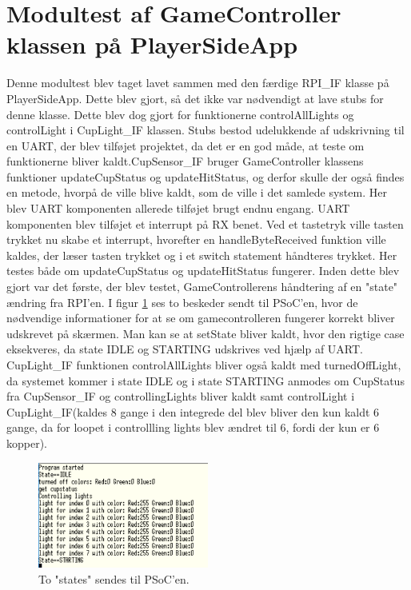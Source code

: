 \documentclass[Modultest/Modultest_main.tex]{subfiles}
\begin{document}
\section{Modultest af GameController klassen på PlayerSideApp}\label{sec:GameController_modultest_bilag}
Denne modultest blev taget lavet sammen med den færdige RPI\_IF klasse på PlayerSideApp. Dette blev gjort, så det ikke var nødvendigt at lave stubs for denne klasse. Dette blev dog gjort for funktionerne controlAllLights og controlLight i CupLight\_IF klassen. Stubs bestod udelukkende af udskrivning til en UART, der blev tilføjet projektet, da det er en god måde, at teste om funktionerne bliver kaldt.CupSensor\_IF bruger GameController klassens funktioner updateCupStatus og updateHitStatus, og derfor skulle der også findes en metode, hvorpå de ville blive kaldt, som de ville i det samlede system. Her blev UART komponenten allerede tilføjet brugt endnu engang. UART komponenten blev tilføjet et interrupt på RX benet. Ved et tastetryk ville tasten trykket nu skabe et interrupt, hvorefter en handleByteReceived funktion ville kaldes, der læser tasten trykket og i et switch statement håndteres trykket. Her testes både om updateCupStatus og updateHitStatus fungerer. Inden dette blev gjort var det første, der blev testet, GameControllerens håndtering af en "state" ændring fra RPI'en. I figur \ref{fig:IDLE_STARTING} ses to beskeder sendt til PSoC'en, hvor de nødvendige informationer for at se om gamecontrolleren fungerer korrekt bliver udskrevet på skærmen. Man kan se at setState bliver kaldt, hvor den rigtige case eksekveres, da state IDLE og STARTING udskrives ved hjælp af UART. CupLight\_IF funktionen controlAllLights bliver også kaldt med turnedOffLight, da systemet kommer i state IDLE og i state STARTING anmodes om CupStatus fra CupSensor\_IF og controllingLights bliver kaldt samt controlLight i CupLight\_IF(kaldes 8 gange i den integrede del blev bliver den kun kaldt 6 gange, da for loopet i controllling lights blev ændret til 6, fordi der kun er 6 kopper).
\begin{figure}[H]
    \centering
    \includegraphics[width=0.5\textwidth]{Modultest/playerside_GameController/graphics/IDLE_STARTING.PNG}
    \caption{To "states" sendes til PSoC'en.}
    \label{fig:IDLE_STARTING}
\end{figure}
\end{document}
